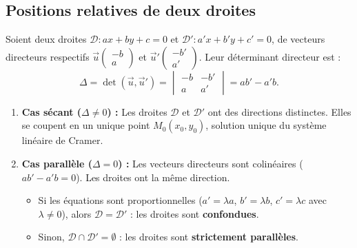 \documentclass[11pt,a4paper]{article}
\renewcommand{\det}{\operatorname{det}}
\begin{document}
\subsection{Positions relatives de deux droites}
Soient deux droites $\mathscr{D} : ax + by + c = 0$ et $\mathscr{D}' : a'x + b'y + c' = 0$, de vecteurs directeurs respectifs $\vec{u}\begin{pmatrix} -b \\ a \end{pmatrix}$ et $\vec{u}'\begin{pmatrix} -b' \\ a' \end{pmatrix}$.
Leur déterminant directeur est :
\[
\Delta = \det(\vec{u}, \vec{u}') = \begin{vmatrix} -b & -b' \\ a & a' \end{vmatrix} = a b' - a' b.
\]
\begin{enumerate}[leftmargin=1.5cm]
    \item \textbf{Cas sécant ($\Delta \neq 0$) :} Les droites $\mathscr{D}$ et $\mathscr{D}'$ ont des directions distinctes. Elles se coupent en un unique point $M_0(x_0, y_0)$, solution unique du système linéaire de Cramer.
    \item \textbf{Cas parallèle ($\Delta = 0$) :} Les vecteurs directeurs sont colinéaires ($ab' - a'b = 0$). Les droites ont la même direction.
    \begin{itemize}
        \item Si les équations sont proportionnelles ($a' = \lambda a$, $b' = \lambda b$, $c' = \lambda c$ avec $\lambda \neq 0$), alors $\mathscr{D} = \mathscr{D}'$ : les droites sont \textbf{confondues}.
        \item Sinon, $\mathscr{D} \cap \mathscr{D}' = \emptyset$ : les droites sont \textbf{strictement parallèles}.
    \end{itemize}
\end{enumerate}
\end{document}
